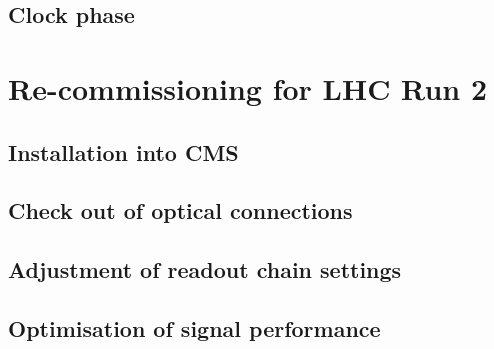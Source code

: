 \subsection*{Clock phase}

\section{Re-commissioning for LHC Run 2}
\subsection{Installation into CMS}
\subsection{Check out of optical connections}
\subsection{Adjustment of readout chain settings}
\subsection{Optimisation of signal performance}